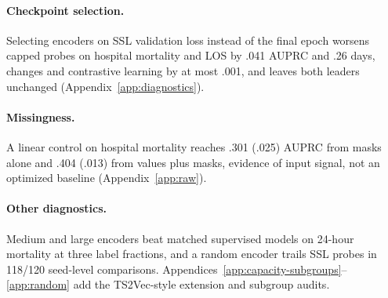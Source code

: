 \paragraph{Checkpoint selection.}
Selecting \MIMIC{} encoders on SSL validation loss instead of the final epoch worsens \JEPA{} capped probes on hospital mortality and LOS by .041 AUPRC and .26 days, changes \MAE{} and contrastive learning by at most .001, and leaves both leaders unchanged (Appendix~\ref{app:diagnostics}).

\paragraph{Missingness.}
A linear control on \MIMIC{} hospital mortality reaches .301 (.025) AUPRC from masks alone and .404 (.013) from values plus masks, evidence of input signal, not an optimized baseline (Appendix~\ref{app:raw}).

\paragraph{Other diagnostics.}
Medium and large \MAE{} encoders beat matched supervised models on \MIMIC{} 24-hour mortality at three label fractions, and a random encoder trails SSL probes in 118/120 seed-level comparisons. Appendices~\ref{app:capacity-subgroups}--\ref{app:random} add the TS2Vec-style extension and subgroup audits.
